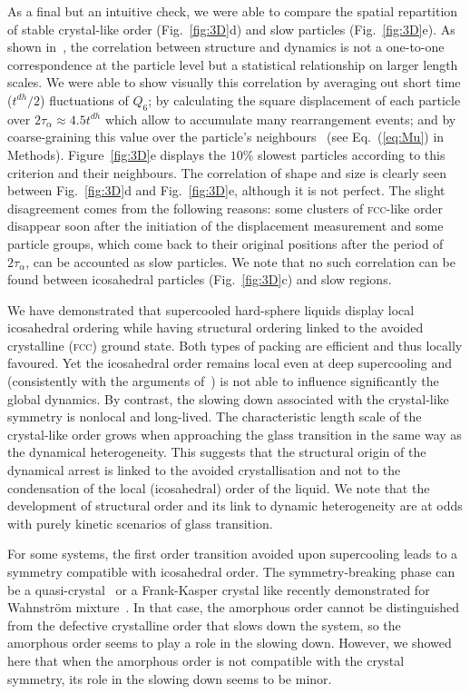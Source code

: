 As a final but an intuitive check, we were able to compare the spatial repartition of stable crystal-like order (Fig.~\ref{fig:3D}d) and slow particles (Fig.~\ref{fig:3D}e). As shown in~\citep{Berthier2007}, the correlation between structure and dynamics is not a one-to-one correspondence at the particle level but a statistical relationship on larger length scales. We were able to show visually this correlation by averaging out short time ($t^{dh}/2$) fluctuations of $Q_6$; by calculating the square displacement of each particle over $2\tau_\alpha\approx 4.5t^{dh}$ which allow to accumulate many rearrangement events; and by coarse-graining this value over the particle's neighbours~\citep{Berthier2007} (see Eq.~(\ref{eq:Mu}) in Methods). Figure~\ref{fig:3D}e displays the $10\%$ slowest particles according to this criterion and their neighbours. The correlation of shape and size is clearly seen between Fig.~\ref{fig:3D}d and Fig.~\ref{fig:3D}e, although it is not perfect. The slight disagreement comes from the following reasons: some clusters of \textsc{fcc}-like order disappear soon after the initiation of the displacement measurement and some particle groups, which come back to their original positions after the period of $2\tau_\alpha$, can be accounted as slow particles. We note that no such correlation can be found between icosahedral particles (Fig.~\ref{fig:3D}c) and slow regions.



We have demonstrated that supercooled hard-sphere liquids display local icosahedral ordering while having structural ordering linked to the avoided crystalline (\textsc{fcc}) ground state. Both types of packing are efficient and thus locally favoured. Yet the icosahedral order remains local even at deep supercooling and (consistently with the arguments of~\citep{Berthier2007}) is not able to influence significantly the global dynamics. By contrast, the slowing down associated with the crystal-like symmetry is nonlocal and long-lived. The characteristic length scale of the crystal-like order grows when approaching the glass transition in the same way as the dynamical heterogeneity. This suggests that the structural origin of the dynamical arrest is linked to the avoided crystallisation and not to the condensation of the local (icosahedral) order of the liquid. We note that the development of structural order and its link to dynamic heterogeneity are at odds with purely kinetic scenarios of glass transition. 

For some systems, the first order transition avoided upon supercooling leads to a symmetry compatible with icosahedral order. The symmetry-breaking phase can be a quasi-crystal~\citep{Doye2003} or a Frank-Kasper crystal like recently demonstrated for Wahnstr\"om mixture~\citep{Pedersen2010}. In that case, the amorphous order cannot be distinguished from the defective crystalline order that slows down the system, so the amorphous order seems to play a role in the slowing down. However, we showed here that when the amorphous order is not compatible with the crystal symmetry, its role in the slowing down seems to be minor.

